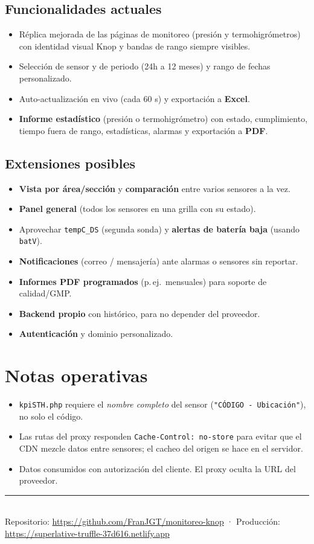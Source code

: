 \documentclass[11pt,a4paper]{article}
\newcommand{\code}[1]{\texttt{\small #1}}
\begin{document}
\subsection{Funcionalidades actuales}
\begin{itemize}[leftmargin=1.4em]
  \item Réplica mejorada de las páginas de monitoreo (presión y termohigrómetros) con
        identidad visual Knop y bandas de rango siempre visibles.
  \item Selección de sensor y de periodo (24h a 12 meses) y rango de fechas personalizado.
  \item Auto-actualización en vivo (cada 60 s) y exportación a \textbf{Excel}.
  \item \textbf{Informe estadístico} (presión o termohigrómetro) con estado, cumplimiento,
        tiempo fuera de rango, estadísticas, alarmas y exportación a \textbf{PDF}.
\end{itemize}

\subsection{Extensiones posibles}
\begin{itemize}[leftmargin=1.4em]
  \item \textbf{Vista por área/sección} y \textbf{comparación} entre varios sensores a la vez.
  \item \textbf{Panel general} (todos los sensores en una grilla con su estado).
  \item Aprovechar \code{tempC\_DS} (segunda sonda) y \textbf{alertas de batería baja} (usando \code{batV}).
  \item \textbf{Notificaciones} (correo / mensajería) ante alarmas o sensores sin reportar.
  \item \textbf{Informes PDF programados} (p.\,ej.\ mensuales) para soporte de calidad/GMP.
  \item \textbf{Backend propio} con histórico, para no depender del proveedor.
  \item \textbf{Autenticación} y dominio personalizado.
\end{itemize}

\section{Notas operativas}\label{sec:notas}
\begin{itemize}[leftmargin=1.4em]
  \item \code{kpiSTH.php} requiere el \emph{nombre completo} del sensor
        (\code{"CÓDIGO - Ubicación"}), no solo el código.
  \item Las rutas del proxy responden \code{Cache-Control: no-store} para evitar que el CDN
        mezcle datos entre sensores; el cacheo del origen se hace en el servidor.
  \item Datos consumidos con autorización del cliente. El proxy oculta la URL del proveedor.
\end{itemize}

\vfill
\noindent\textcolor{knopgreen}{\rule{\textwidth}{0.8pt}}\\[2pt]
{\footnotesize Repositorio: \url{https://github.com/FranJGT/monitoreo-knop} \quad·\quad
Producción: \url{https://superlative-truffle-37d616.netlify.app}}
\end{document}
